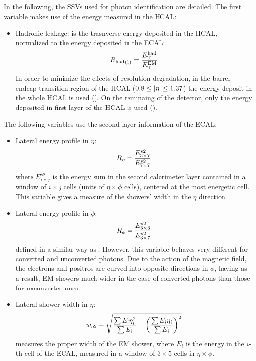 In the following, the \acp{SSV} used for photon identification are detailed.
The first variable makes use of the energy measured in the \ac{HCAL}:
\begin{itemize}
    \item Hadronic leakage: is the trasnverse energy deposited in the \ac{HCAL}, normalized to the energy deposited in the \ac{ECAL}:
        \begin{equation}
            {\ensuremath{R_{\text{had}}}}_{(1)} = \frac{E_{\text{T}}^{\text{had}}}{E_{\text{T}}^{\text{EM}}}
        \end{equation}
        In order to minimize the effects of resolution degradation, in the barrel-endcap transition region of the \ac{HCAL} (\(0.8\leq |\eta|\leq 1.37\)) the energy deposit in the whole \ac{HCAL} is used (\rhad). On the reminaing of the detector, only the energy deposited in first layer of the \ac{HCAL} is used (\rhado).
\end{itemize}
The following variables use the second-layer information of the \ac{ECAL}:
\begin{itemize}
    \item Lateral energy profile in \(\eta\):
        \begin{equation}
            R_{\eta} = \frac{E_{3\times7}^{s2}}{E_{7\times7}^{s2}}
        \end{equation}
        where \(E_{i\times j}^{s2}\) is the energy sum in the second calorimeter layer contained in a window of \(i \times j \) cells (units of \(\eta \times \phi\) cells), centered at the most energetic cell. This variable gives a measure of the showers' width in the \(\eta\) direction.
    \item Lateral energy profile in \(\phi\):
        \begin{equation}
            R_{\phi} = \frac{E_{3\times3}^{s2}}{E_{3\times7}^{s2}}
        \end{equation}
        defined in a similar way as \reta. However, this variable behaves very different for converted and unconverted photons. Due to the action of the magnetic field, the electrons and positros are curved into opposite directions in \(\phi\), having as a result, \ac{EM} showers much wider in the case of converted photons than those for unconverted ones.
    \item Lateral shower width in \(\eta\):
        \begin{equation}
            w_{\eta 2} = \sqrt{
                \frac{\sum E_i \eta_i^2}{\sum E_i}
                -
                \left(\frac{\sum E_i \eta_i}{\sum E_i}\right)^2
            }
        \end{equation}
        measures the proper width of the \ac{EM} shower, where \(E_i\) is the energy in the \(i\)-th cell of the \ac{ECAL}, measured in a window of \(3\times 5 \) cells in \(\eta \times \phi\).
\end{itemize}
